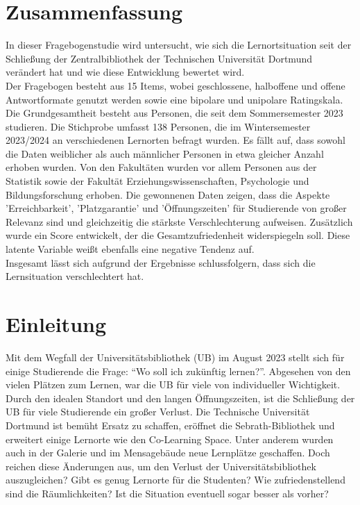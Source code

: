 \documentclass[11pt, a4paper]{article}
\begin{document}
\section*{Zusammenfassung}
In dieser Fragebogenstudie wird untersucht, wie sich die Lernortsituation seit der Schließung der Zentralbibliothek der Technischen Universität Dortmund verändert hat und wie diese Entwicklung bewertet wird.\\
Der Fragebogen besteht aus 15 Items, wobei geschlossene, halboffene und offene Antwortformate genutzt werden sowie eine bipolare und unipolare Ratingskala. \\
Die Grundgesamtheit besteht aus Personen, die seit dem Sommersemester 2023 studieren. Die Stichprobe umfasst 138 Personen, die im Wintersemester 2023/2024 an verschiedenen Lernorten befragt wurden.
Es fällt auf, dass sowohl die Daten weiblicher als auch männlicher Personen in etwa gleicher Anzahl erhoben wurden. Von den Fakultäten wurden vor allem Personen aus der Statistik sowie der Fakultät Erziehungswissenschaften, Psychologie und Bildungsforschung erhoben.
Die gewonnenen Daten zeigen, dass die Aspekte 'Erreichbarkeit',  'Platzgarantie' und 'Öffnungszeiten' für Studierende von großer Relevanz sind und gleichzeitig die stärkste Verschlechterung aufweisen. Zusätzlich wurde ein Score entwickelt, der die Gesamtzufriedenheit widerspiegeln soll. Diese latente Variable weißt ebenfalls eine negative Tendenz auf.\\
Insgesamt lässt sich aufgrund der Ergebnisse schlussfolgern, dass sich die Lernsituation verschlechtert hat.

\newpage\null\thispagestyle{empty}\newpage

\newpage
\cleardoublepage%
\section{Einleitung}
\label{Einleitung}
Mit dem Wegfall der Universitätsbibliothek (UB) im August 2023 stellt sich für einige Studierende die Frage: “Wo soll ich zukünftig lernen?”.
Abgesehen von den vielen Plätzen zum Lernen, war die UB für viele von individueller Wichtigkeit.
Durch den idealen Standort und den langen Öffnungszeiten, ist die Schließung der UB für viele Studierende ein großer Verlust.
Die Technische Universität Dortmund ist bemüht Ersatz zu schaffen, eröffnet die Sebrath-Bibliothek und erweitert einige Lernorte wie den Co-Learning Space.
Unter anderem wurden auch in der Galerie und im Mensagebäude neue Lernplätze geschaffen.
Doch reichen diese Änderungen aus, um den Verlust der Universitätsbibliothek auszugleichen?
Gibt es genug Lernorte für die Studenten? Wie zufriedenstellend sind die Räumlichkeiten?
Ist die Situation eventuell sogar besser als vorher?
\end{document}
